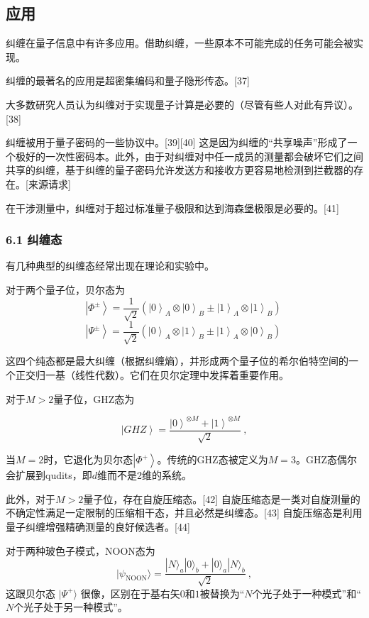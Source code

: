 \subsection{应用}
纠缠在量子信息中有许多应用。借助纠缠，一些原本不可能完成的任务可能会被实现。

纠缠的最著名的应用是超密集编码和量子隐形传态。[37]

大多数研究人员认为纠缠对于实现量子计算是必要的（尽管有些人对此有异议）。[38]

纠缠被用于量子密码的一些协议中。[39][40] 这是因为纠缠的“共享噪声”形成了一个极好的一次性密码本。此外，由于对纠缠对中任一成员的测量都会破坏它们之间共享的纠缠，基于纠缠的量子密码允许发送方和接收方更容易地检测到拦截器的存在。[来源请求]

在干涉测量中，纠缠对于超过标准量子极限和达到海森堡极限是必要的。[41]

\subsubsection{6.1 纠缠态}
有几种典型的纠缠态经常出现在理论和实验中。

对于两个量子位，贝尔态为
$$\left| \Phi^{\pm} \right\rangle = \frac{1}{\sqrt{2}} \left( \left| 0 \right\rangle_A \otimes \left| 0 \right\rangle_B \pm \left| 1 \right\rangle_A \otimes \left| 1 \right\rangle_B \right)~$$
$$\left| \Psi^{\pm} \right\rangle = \frac{1}{\sqrt{2}} \left( \left| 0 \right\rangle_A \otimes \left| 1 \right\rangle_B \pm \left| 1 \right\rangle_A \otimes \left| 0 \right\rangle_B \right)~$$

这四个纯态都是最大纠缠（根据纠缠熵），并形成两个量子位的希尔伯特空间的一个正交归一基（线性代数）。它们在贝尔定理中发挥着重要作用。

对于$M>2$量子位，GHZ态为

$$\left| GHZ \right\rangle = \frac{\left| 0 \right\rangle^{\otimes M} + \left| 1 \right\rangle^{\otimes M}}{\sqrt{2}}~,$$

当$M=2$时，它退化为贝尔态$\left| \Phi^{+} \right\rangle$。传统的GHZ态被定义为$M=3$。GHZ态偶尔会扩展到qudits，即$d$维而不是2维的系统。

此外，对于$M>2$量子位，存在自旋压缩态。[42] 自旋压缩态是一类对自旋测量的不确定性满足一定限制的压缩相干态，并且必然是纠缠态。[43] 自旋压缩态是利用量子纠缠增强精确测量的良好候选者。[44]

对于两种玻色子模式，NOON态为
\begin{equation}
|\psi_{\text{NOON}}\rangle = \frac{|N\rangle_a |0\rangle_b + |0\rangle_a |N\rangle_b}{\sqrt{2}}~,
\end{equation}
这跟贝尔态 $|\Psi^+\rangle$ 很像，区别在于基右矢$0$和$1$被替换为“$N$个光子处于一种模式”和“$N$个光子处于另一种模式”。

